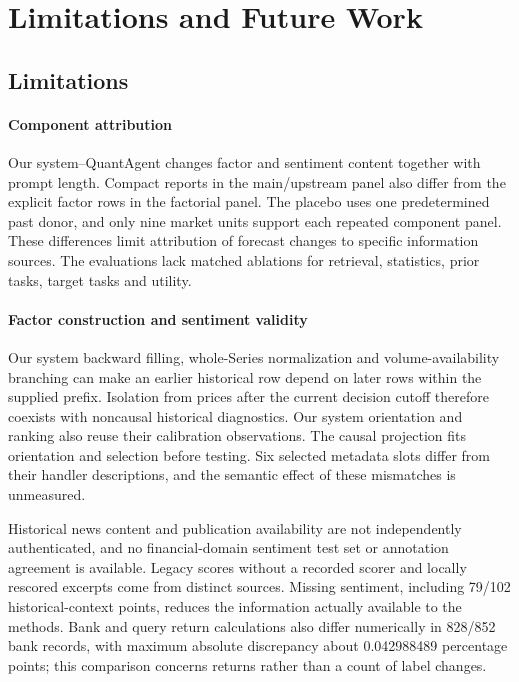 \section{Limitations and Future Work}
\label{sec:limitations}

\subsection{Limitations}
\paragraph{Component attribution}
Our system--QuantAgent changes factor and sentiment content together with prompt length. Compact reports in the main/upstream panel also differ from the explicit factor rows in the factorial panel. The placebo uses one predetermined past donor, and only nine market units support each repeated component panel. These differences limit attribution of forecast changes to specific information sources. The evaluations lack matched ablations for retrieval, statistics, prior tasks, target tasks and utility.

\paragraph{Factor construction and sentiment validity}
Our system backward filling, whole-Series normalization and volume-availability branching can make an earlier historical row depend on later rows within the supplied prefix. Isolation from prices after the current decision cutoff therefore coexists with noncausal historical diagnostics. Our system orientation and ranking also reuse their calibration observations. The causal projection fits orientation and selection before testing. Six selected metadata slots differ from their handler descriptions, and the semantic effect of these mismatches is unmeasured.

Historical news content and publication availability are not independently authenticated, and no financial-domain sentiment test set or annotation agreement is available. Legacy scores without a recorded scorer and locally rescored excerpts come from distinct sources. Missing sentiment, including 79/102 historical-context points, reduces the information actually available to the methods. Bank and query return calculations also differ numerically in 828/852 bank records, with maximum absolute discrepancy about 0.042988489 percentage points; this comparison concerns returns rather than a count of label changes.

